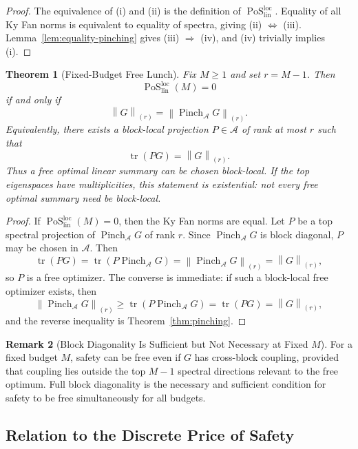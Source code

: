 \documentclass[12pt]{article}
\newtheorem{theorem}{Theorem}[section]
\theoremstyle{definition}
\newtheorem{remark}[theorem]{Remark}
\DeclareMathOperator{\tr}{tr}
\DeclareMathOperator{\PoS}{PoS}
\newcommand{\EA}{\operatorname{Pinch}_{\mathcal A}}
\newcommand{\KyF}[2]{\left\|#1\right\|_{(#2)}}
\newcommand{\PoSlin}{\PoS_{\mathrm{lin}}^{\mathrm{loc}}}
\begin{document}
\begin{proof}
The equivalence of (i) and (ii) is the definition of $\PoSlin$.  Equality of
all Ky Fan norms is equivalent to equality of spectra, giving
(ii) $\Leftrightarrow$ (iii).  Lemma~\ref{lem:equality-pinching} gives
(iii) $\Rightarrow$ (iv), and (iv) trivially implies (i).
\end{proof}

\begin{theorem}[Fixed-Budget Free Lunch]
\label{thm:pos-fixedM}
Fix $M\ge1$ and set $r=M-1$.  Then
\[
\PoSlin(M)=0
\]
if and only if
\[
\KyF{G}{r}=\KyF{\EA G}{r}.
\]
Equivalently, there exists a block-local projection $P\in\mathcal A$ of rank
at most $r$ such that
\[
\tr(PG)=\KyF{G}{r}.
\]
Thus a free optimal linear summary can be chosen block-local.  If the top
eigenspaces have multiplicities, this statement is existential: not every free
optimal summary need be block-local.
\end{theorem}

\begin{proof}
If $\PoSlin(M)=0$, then the Ky Fan norms are equal.  Let $P$ be a top spectral
projection of $\EA G$ of rank $r$.  Since $\EA G$ is block diagonal, $P$ may
be chosen in $\mathcal A$.  Then
\[
\tr(PG)
=
\tr(P\EA G)
=
\KyF{\EA G}{r}
=
\KyF{G}{r},
\]
so $P$ is a free optimizer.  The converse is immediate: if such a block-local
free optimizer exists, then
\[
\KyF{\EA G}{r}
\ge
\tr(P\EA G)
=
\tr(PG)
=
\KyF{G}{r},
\]
and the reverse inequality is Theorem~\ref{thm:pinching}.
\end{proof}

\begin{remark}[Block Diagonality Is Sufficient but Not Necessary at Fixed $M$]
\label{rem:pos-fixed-not-blockdiag}
For a fixed budget $M$, safety can be free even if $G$ has cross-block
coupling, provided that coupling lies outside the top $M-1$ spectral directions
relevant to the free optimum.  Full block diagonality is the necessary and
sufficient condition for safety to be free simultaneously for all budgets.
\end{remark}

\subsection{Relation to the Discrete Price of Safety}
\label{subsec:pos-discrete}
\end{document}
